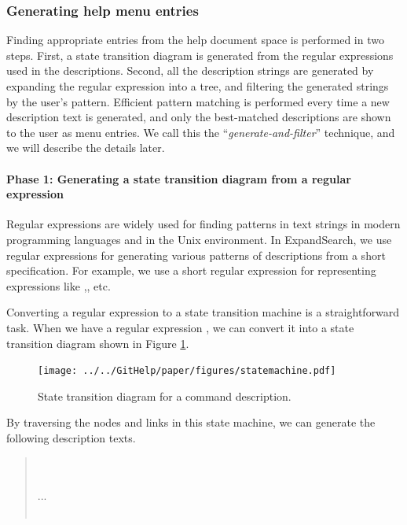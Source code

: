 \documentclass[manuscript,anonymous,review]{acmart}
\def\ES{\textsf{ExpandSearch}}
\begin{document}
\subsubsection{Generating help menu entries}

Finding appropriate entries from the
help document space is
performed in two steps.
First, a state transition diagram is generated from the regular expressions
used in the descriptions.
Second, all the description strings are generated by expanding the regular expression
into a tree, and filtering the generated strings by the user's pattern.
Efficient pattern matching is performed every time a new description text is generated,
and only the best-matched descriptions are shown to the user as menu entries.
We call this the ``\textit{generate-and-filter}'' technique,
and we will describe the details later.

\paragraph{Phase 1: Generating a state transition diagram from a regular expression}

Regular expressions are widely used for finding patterns in text strings
in modern programming languages and in the Unix environment.
In {\ES}, we use regular expressions for
generating various patterns of descriptions from a short specification.
For example, we use a short regular expression
for representing expressions like
,, etc.

Converting a regular expression to a state transition machine is a
straightforward task.
When we have a regular expression
, 
we can convert it into a state transition diagram
shown in Figure \ref{statemachine1}.

\begin{figure}[htb]
\texttt{[image: ../../GitHelp/paper/figures/statemachine.pdf]}
\caption{State transition diagram for a  command description.}
\label{statemachine1}
\end{figure}

By traversing the nodes and links in this state machine,
we can generate the following description texts.

\begin{quote}
\small
{} \\
 \\
...\\
\\
\end{quote}
\end{document}
